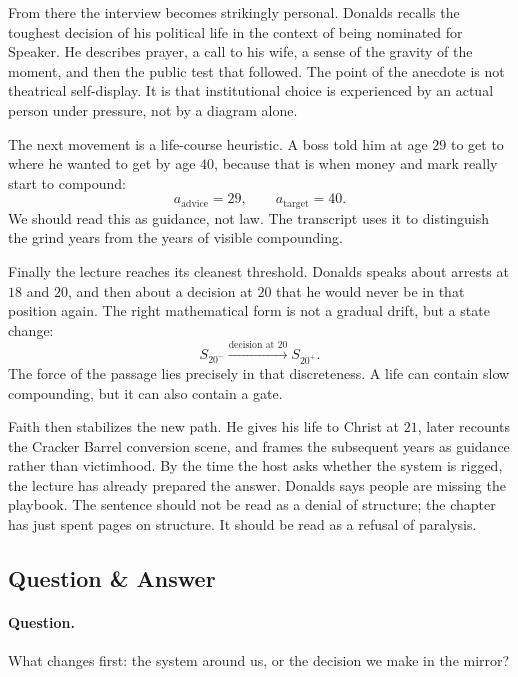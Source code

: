 From there the interview becomes strikingly personal. Donalds recalls the toughest decision of his political life in the context of being nominated for Speaker. He describes prayer, a call to his wife, a sense of the gravity of the moment, and then the public test that followed. The point of the anecdote is not theatrical self-display. It is that institutional choice is experienced by an actual person under pressure, not by a diagram alone.

The next movement is a life-course heuristic. A boss told him at age $29$ to get to where he wanted to get by age $40$, because that is when money and mark really start to compound:
\begin{equation}
a_{\text{advice}}=29,\qquad a_{\text{target}}=40.
\end{equation}
We should read this as guidance, not law. The transcript uses it to distinguish the grind years from the years of visible compounding.

Finally the lecture reaches its cleanest threshold. Donalds speaks about arrests at $18$ and $20$, and then about a decision at $20$ that he would never be in that position again. The right mathematical form is not a gradual drift, but a state change:
\begin{equation}
S_{20^-}\xrightarrow{\text{decision at }20} S_{20^+}.
\end{equation}
The force of the passage lies precisely in that discreteness. A life can contain slow compounding, but it can also contain a gate.

Faith then stabilizes the new path. He gives his life to Christ at $21$, later recounts the Cracker Barrel conversion scene, and frames the subsequent years as guidance rather than victimhood. By the time the host asks whether the system is rigged, the lecture has already prepared the answer. Donalds says people are missing the playbook. The sentence should not be read as a denial of structure; the chapter has just spent pages on structure. It should be read as a refusal of paralysis.

\subsection{Question \& Answer}

\paragraph{Question.} What changes first: the system around us, or the decision we make in the mirror?

